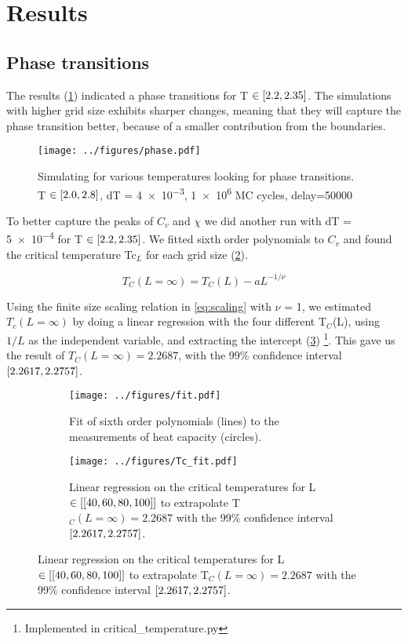 \section{Results}

\subsection{Phase transitions}

The results (\cref{fig:phase}) indicated a phase transitions for T $\in
\left[2.2,2.35\right]$. The simulations with higher grid size exhibits sharper
changes, meaning that they will capture the phase transition better, because of
a smaller contribution from the boundaries.

\begin{figure}[htp]
  \centering
  \texttt{[image: ../figures/phase.pdf]}
  \caption{Simulating for various temperatures looking for phase transitions. \\
  T $\in \left[2.0,2.8\right]$, dT = \num{4e-3}, \num{1e6} MC cycles, delay=50000}
  \label{fig:phase}
\end{figure}


To better capture the peaks of $C_v$ and $\chi$ we did another
run with dT = \num{5e-4} for T $\in \left[2.2, 2.35\right]$.
 We fitted sixth order polynomials to $C_v$ and found
the critical temperature Tc$_{L}$ for each grid size (\ref{fig:polyfit}).


\begin{equation}
  \label{eq:scaling}
  T_C(L=\infty) = T_C(L) - aL^{-1/\nu}
\end{equation}

Using the finite size scaling relation in
\cref{eq:scaling} with $\nu$ = 1, we estimated $T_c(L=\infty)$
by doing a linear
regression with the four different T$_C$(L), using $1/L$ as the independent
variable, and extracting the intercept (\cref{fig:lin_reg})
\footnote{Implemented in critical\_temperature.py}.  This gave us the result of
$T_C(L=\infty)=2.2687$, with the 99\% confidence interval $\left[2.2617, 2.2757\right]$.




 \begin{figure}[h]
   \begin{subfigure}[t]{.5\textwidth} %
     \centering
     \texttt{[image: ../figures/fit.pdf]}
     \caption{Fit of sixth order polynomials (lines) to the measurements
     of heat capacity (circles).}
     \label{fig:polyfit}
   \end{subfigure}
   \hfill
   \begin{subfigure}[t]{.5\textwidth}
     \centering
     \texttt{[image: ../figures/Tc\_fit.pdf]}
     \caption{Linear regression on the critical temperatures for L $\in \left[[40,60,80,100]\right]$
     to extrapolate T$_C(L=\infty) = 2.2687$ with the 99\% confidence
     interval $\left[2.2617, 2.2757\right]$.
     }
     \label{fig:lin_reg}
   \end{subfigure}
   \label{fig:test}
 \end{figure}




 \begin{table}[h]
   \centering
   \caption{Results for T$_C(L=\infty)$.}
   \label{tab:critical}
 \end{table}
